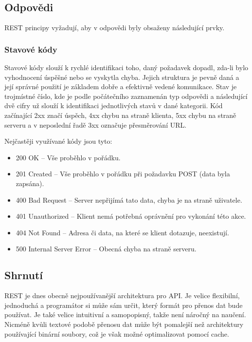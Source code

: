 \subsection{Odpovědi}
REST principy vyžadují, aby v odpovědi byly obsaženy následující prvky.

\subsubsection*{Stavové kódy}
Stavové kódy slouží k rychlé identifikaci toho, daný požadavek dopadl, zda-li bylo vyhodnocení úspěšné nebo se vyskytla chyba. Jejich struktura je pevně daná a její správné použití je základem dobře a efektivně vedené komunikace. Stav je trojmístné číslo, kde je podle počátečního zaznamenán typ odpovědi a následující dvě cifry už slouží k identifikaci jednotlivých stavů v dané kategorii. Kód začínající 2xx značí úspěch, 4xx chybu na straně klienta, 5xx chybu na straně serveru a v neposlední řadě 3xx označuje přesměrování URL.

Nejčastěji využívané kódy jsou tyto:

\begin{itemize}
    \item 200 OK -- Vše proběhlo v pořádku.
    \item 201 Created -- Vše proběhlo v pořádku při požadavku POST (data byla zapsána).
    \item 400 Bad Request -- Server nepřijímá tato data, chyba je na straně uživatele.
    \item 401 Unauthorized -- Klient nemá potřebná oprávnění pro vykonání této akce.
    \item 404 Not Found -- Adresa či data, na které se klient dotazuje, neexistují.
    \item 500 Internal Server Error -- Obecná chyba na straně serveru.
\end{itemize}


\subsection{Shrnutí}
REST je dnes obecně nejpoužívanější architektura pro API. Je velice flexibilní, jednoduchá a programátor si může sám určit, který formát pro přenos dat bude používat. Je také velice intuitivní a samopopisný, takže není náročný na naučení. Nicméně kvůli textové podobě přenosu dat může být pomalejší než architektury používající binární soubory, což je však možné optimalizovat pomocí cache. \cite[]{devToApiStyles}


